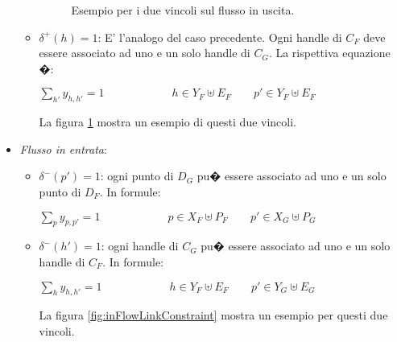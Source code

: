 \begin{itemize}
\begin{itemize}
\begin{figure*}[th]
\begin{tikzpicture}
	
	\end{tikzpicture}
	\caption{Esempio per i due vincoli sul flusso in uscita. \label{fig:outFlowLinkConstraint}}
	\end{figure*}
			
			\item
			\emph{$\delta^+(h)=1$}:
			E' l'analogo del caso precedente. Ogni handle di $C_F$ deve essere associato ad uno e un solo handle di $C_G$. La rispettiva equazione �:
				\begin{center}
				$\sum\limits_{h'}y_{h,h'} = 1 \qquad \qquad \qquad h \in Y_F \uplus E_F \qquad p' \in Y_F \uplus E_F$
				\end{center}

			
			La figura \ref{fig:outFlowLinkConstraint} mostra un esempio di questi due vincoli.

		\end{itemize}
		
		
	\item
	\emph{Flusso in entrata}:
		\begin{itemize}
			\item
			\emph{$\delta^-(p')=1$}: ogni punto di $D_G$ pu� essere associato ad uno e un solo punto di $D_F$. In formule:
				\begin{center}
				$\sum\limits_{p}y_{p,p'} = 1 \qquad \qquad \qquad p \in X_F \uplus P_F \qquad p' \in X_G \uplus P_G$
				\end{center}
				
			
			\item
			\emph{$\delta^-(h')=1$}: ogni handle di $C_G$ pu� essere associato ad uno e un solo handle di $C_F$. In formule:
				\begin{center}
				$\sum\limits_{h}y_{h,h'} = 1 \qquad \qquad \qquad h \in Y_F \uplus E_F \qquad p' \in Y_G \uplus E_G$
				\end{center}
			La figura \ref{fig:inFlowLinkConstraint} mostra un esempio per questi due vincoli.
			
			
	\begin{figure*}[th]
	\centering
\end{figure*}
\end{itemize}
\end{itemize}
